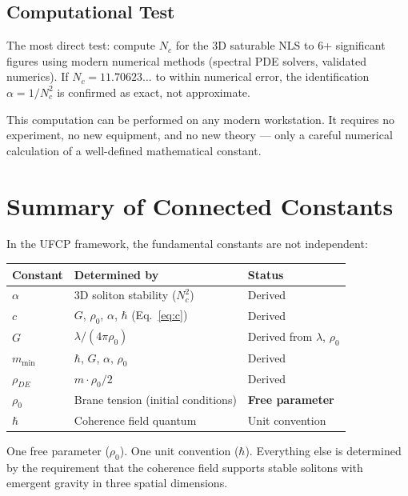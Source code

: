 \documentclass[11pt, a4paper]{article}
\begin{document}
\subsection{Computational Test}

The most direct test: compute $N_c$ for the 3D saturable NLS
to 6+ significant figures using modern numerical methods
(spectral PDE solvers, validated numerics). If
$N_c = 11.70623\ldots$ to within numerical error, the
identification $\alpha = 1/N_c^2$ is confirmed as exact, not
approximate.

This computation can be performed on any modern workstation.
It requires no experiment, no new equipment, and no new theory
--- only a careful numerical calculation of a well-defined
mathematical constant.

\section{Summary of Connected Constants}

In the UFCP framework, the fundamental constants are not
independent:

\begin{center}
\begin{tabular}{@{}lll@{}}
\toprule
\textbf{Constant} & \textbf{Determined by} & \textbf{Status} \\
\midrule
$\alpha$ & 3D soliton stability ($N_c^2$) & Derived \\
$c$ & $G$, $\rho_0$, $\alpha$, $\hbar$ (Eq.~\ref{eq:c}) & Derived \\
$G$ & $\lambda/(4\pi\rho_0)$ & Derived from $\lambda$, $\rho_0$ \\
$m_{\min}$ & $\hbar$, $G$, $\alpha$, $\rho_0$ & Derived \\
$\rho_{DE}$ & $m \cdot \rho_0 / 2$ & Derived \\
$\rho_0$ & Brane tension (initial conditions) & \textbf{Free parameter} \\
$\hbar$ & Coherence field quantum & Unit convention \\
\bottomrule
\end{tabular}
\end{center}

One free parameter ($\rho_0$). One unit convention ($\hbar$).
Everything else is determined by the requirement that the
coherence field supports stable solitons with emergent gravity
in three spatial dimensions.

\end{document}
